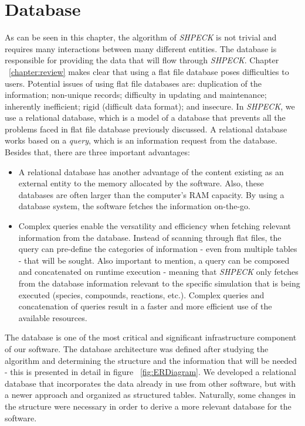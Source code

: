 \section{Database}
As can be seen in this chapter, the algorithm of \emph{SHPECK} is not trivial and requires many interactions between many different entities. The database is responsible for providing the data that will flow through \emph{SHPECK}. Chapter ~\ref{chapter:review} makes clear that using a flat file database poses difficulties to users. Potential issues of using flat file databases are: duplication of the information; non-unique records; difficulty in updating and maintenance; inherently inefficient; rigid (difficult data format); and insecure.
In \emph{SHPECK}, we use a relational database, which is a model of a database that prevents all the problems faced in flat file database previously discussed. A relational database works based on a \emph{query}, which is an information request from the database. Besides that, there are three important advantages:
\begin{itemize}
\item A relational database has another advantage of the content existing as an external entity to the memory allocated by the software. Also, these databases are often larger than the computer's RAM capacity. By using a database system, the software fetches the information on-the-go. 
\item Complex queries enable the versatility and efficiency when fetching relevant information from the database. Instead of scanning through flat files, the query can pre-define the categories of information - even from multiple tables - that will be sought. Also important to mention, a query can be composed and concatenated on runtime execution - meaning that \emph{SHPECK} only fetches from the database information relevant to the specific simulation that is being executed (species, compounds, reactions, etc.). Complex queries and concatenation of queries result in a faster and more efficient use of the available resources.
\end{itemize}

The database is one of the most critical and significant infrastructure component of our software. The database architecture was defined after studying the algorithm and determining the structure and the information that will be needed - this is presented in detail in figure ~\ref{fig:ERDiagram}. We developed a relational database that incorporates the data already in use from other software, but with a newer approach and organized as structured tables. Naturally, some changes in the structure were necessary in order to derive a more relevant database for the software.

